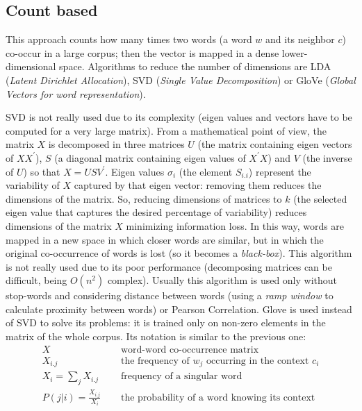 \documentclass[11pt, a4page]{article}
\begin{document}
\subsection{Count based}
This approach counts how many times two words (a word $w$ and its neighbor $c$) co-occur in a large corpus; then the vector is mapped in a dense lower-dimensional space.
Algorithms to reduce the number of dimensions are LDA (\textit{Latent Dirichlet Allocation}), SVD (\textit{Single Value Decomposition}) or GloVe (\textit{Global Vectors for word representation}).

SVD is not really used due to its complexity (eigen values and vectors have to be computed for a very large matrix).
From a mathematical point of view, the matrix $X$ is decomposed in three matrices $U$ (the matrix containing eigen vectors of $X X^\prime$), $S$ (a diagonal matrix containing eigen values of $X^\prime X$) and $V$ (the inverse of $U$) so that $X = U S V^\prime$.
Eigen values $\sigma_i$ (the element $S_{i.i}$) represent the variability of $X$ captured by that eigen vector: removing them reduces the dimensions of the matrix.
So, reducing dimensions of matrices to $k$ (the selected eigen value that captures the desired percentage of variability) reduces dimensions of the matrix $X$ minimizing information loss.
In this way, words are mapped in a new space in which closer words are similar, but in which the original co-occurrence of words is lost (so it becomes a \textit{black-box}).
This algorithm is not really used due to its poor performance (decomposing matrices can be difficult, being $O(n^2)$ complex).
Usually this algorithm is used only without stop-words and considering distance between words (using a \textit{ramp window} to calculate proximity between words) or Pearson Correlation.
Glove is used instead of SVD to solve its problems: it is trained only on non-zero elements in the matrix of the whole corpus.
Its notation is similar to the previous one:
\begin{align*}
  X \hspace{15pt} & \text{word-word co-occurrence matrix} \\
  X_{i.j} \hspace{15pt} & \text{the frequency of $w_j$ occurring in the context $c_i$} \\
  X_i = \sum_j X_{i.j} \hspace{15pt} & \text{frequency of a singular word} \\
  P(j|i) = \frac{X_{i.j}}{X_i} \hspace{15pt} & \text{the probability of a word knowing its context}
\end{align*}
\end{document}
